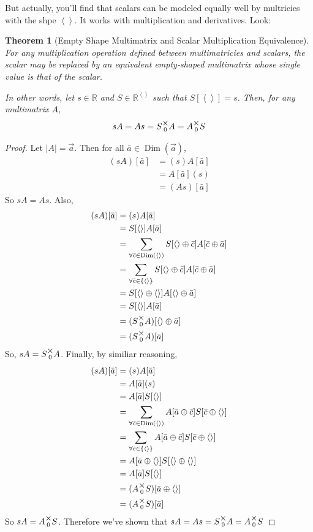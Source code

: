 \documentclass[12pt]{book}
\theoremstyle{plain}
\newtheorem{theorem}{Theorem}[chapter]
\theoremstyle{definition}
\theoremstyle{ppart}
\theoremstyle{case}
\theoremstyle{solution}
\DeclareMathOperator{\Dim}{Dim}
\newcommand{\mmult}[1]{\text{\raisebox{1ex}{$\underset{#1}{\times}$}}}
\begin{document}
But actually, you'll find that scalars can be modeled equally well by multricies
with the shpe $\left<\right>$. It works with multiplication and derivatives. Look:

\begin{theorem}[Empty Shape Multimatrix and Scalar Multiplication Equivalence]
\label{s_mm_mult_equiv}
For any multiplication operation defined between multimatricies and scalars,
the scalar may be replaced by an equivalent empty-shaped multimatrix whose
single value is that of the scalar.

In other words, let $s \in \mathbb{R}$ and $S \in \mathbb{R}^{\left<\right>}$ such that
$S[\left<\right>] = s$. Then, for any multimatrix $A$, 
\[ sA = As = S \mmult{0} A = A \mmult{0} S \]
\end{theorem}
\begin{proof}
Let $|A| = \vec{a}$. Then for all $\bar{a} \in \Dim(\vec{a})$,
\begin{align*}
	(sA)[\bar{a}]
	&= (s)A[\bar{a}] \\
	&= A[\bar{a}](s) \\
	&= (As)[\bar{a}]
\end{align*}
So $sA = As$. Also,
\begin{align*}
	(sA)[\bar{a}]
	&= (s)A[\bar{a}] \\
	&= S[\left<\right>]A[\bar{a}] \\
	&= \sum_{\forall \bar{c} \in \Dim(\left<\right>)}
		S[\left<\right> \oplus \bar{c}]A[\bar{c} \oplus \bar{a}] \\
	&= \sum_{\forall \bar{c} \in \{\left<\right>\}}
		S[\left<\right> \oplus \bar{c}]A[\bar{c} \oplus \bar{a}] \\
	&= S[\left<\right> \oplus \left<\right>]A[\left<\right> \oplus \bar{a}] \\
	&= S[\left<\right>]A[\bar{a}] \\
	&= (S \mmult{0} A)[\left<\right> \oplus \bar{a}] \\
	&= (S \mmult{0} A)[\bar{a}] \\
\end{align*}
So, $sA = S \mmult{0} A$.
Finally, by similiar reasoning,
\begin{align*}
	(sA)[\bar{a}]
	&= (s)A[\bar{a}] \\
	&= A[\bar{a}](s) \\
	&= A[\bar{a}]S[\left<\right>] \\
	&= \sum_{\forall \bar{c} \in \Dim(\left<\right>)}
		A[\bar{a} \oplus \bar{c}] S[\bar{c} \oplus \left<\right>] \\
	&= \sum_{\forall \bar{c} \in \{\left<\right>\}}
		A[\bar{a} \oplus \bar{c}] S[\bar{c} \oplus \left<\right>] \\
	&= A[\bar{a} \oplus \left<\right>] S[\left<\right> \oplus \left<\right>] \\
	&= A[\bar{a}]S[\left<\right>] \\
	&= (A \mmult{0} S)[\bar{a} \oplus \left<\right>] \\
	&= (A \mmult{0} S)[\bar{a}]
\end{align*}
So $sA = A \mmult{0} S$. Therefore we've shown that
$sA = As = S \mmult{0} A = A \mmult{0} S$
\end{proof}
\end{document}
